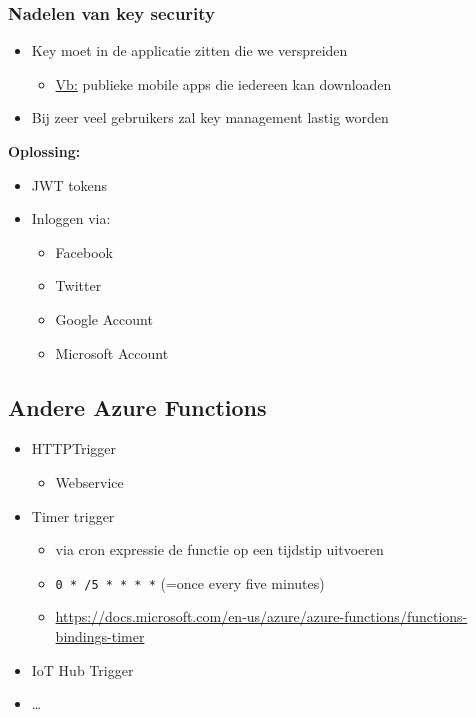 \documentclass{article}
\newcommand{\bold}[1]{\textbf{#1}}
\begin{document}
\subsubsection{Nadelen van key security}
\begin{itemize}
    \item Key moet in de applicatie zitten die we verspreiden
    \begin{itemize}
        \item \underline{Vb:} publieke mobile apps die iedereen kan downloaden
    \end{itemize}
    \item Bij zeer veel gebruikers zal key management lastig worden
\end{itemize}

\bold{Oplossing:}

\begin{itemize}
    \item JWT tokens
    \item Inloggen via:
    \begin{itemize}
        \item Facebook
        \item Twitter
        \item Google Account
        \item Microsoft Account
    \end{itemize}
\end{itemize}

\subsection{Andere Azure Functions}
\begin{itemize}
    \item HTTPTrigger
    \begin{itemize}
        \item Webservice
    \end{itemize}
    \item Timer trigger
    \begin{itemize}
        \item via cron expressie de functie op een tijdstip uitvoeren
        \item \texttt{0 * /5 * * * *}  (=once every five minutes)
        \item \url{https://docs.microsoft.com/en-us/azure/azure-functions/functions-bindings-timer}
    \end{itemize}
    \item IoT Hub Trigger
    \item \dots
\end{itemize}
\end{document}
